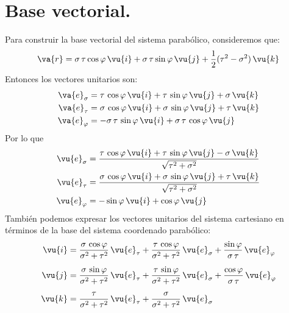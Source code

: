 \section{Base vectorial.}
Para construir la base vectorial del sistema parabólico, consideremos que:
\begin{align*}
\va{r} = \sigma \, \tau \cos \varphi \, \vu{i} + \sigma \, \tau \sin \varphi \, \vu{j} + \dfrac{1}{2} (\tau^{2} - \sigma^{2}) \, \vu{k}
\end{align*}
Entonces los vectores unitarios son:
\begin{align*}
\va{e}_{\sigma} &= \tau \, \cos \varphi \, \vu{i} + \tau \, \sin \varphi \, \vu{j} + \sigma \, \vu{k} \\
\va{e}_{\tau} &= \sigma \, \cos \varphi \, \vu{i} + \sigma \, \sin \varphi \, \vu{j} + \tau \, \vu{k} \\
\va{e}_{\varphi} &= - \sigma \, \tau \, \sin \varphi \, \vu{i} + \sigma \, \tau \, \cos \varphi \, \vu{j}
\end{align*}
Por lo que
\begin{align*}
\vu{e}_{\sigma} &= \dfrac{\tau \, \cos \varphi \, \vu{i} + \tau \, \sin \varphi \, \vu{j} - \sigma \, \vu{k}}{\sqrt{\tau^{2} + \sigma^{2}}} \\
\vu{e}_{\tau} &= \dfrac{\sigma \, \cos \varphi \, \vu{i} + \sigma \, \sin \varphi \, \vu{j} + \tau \, \vu{k}}{\sqrt{\tau^{2} + \sigma^{2}}} \\
\vu{e}_{\varphi} &= - \sin \varphi \, \vu{i} + \cos \varphi \, \vu{j}
\end{align*}
También podemos expresar los vectores unitarios del sistema cartesiano en términos de la base del sistema coordenado parabólico:
\begin{align*}
\vu{i} &= \dfrac{\sigma \, \cos \varphi}{\sigma^{2} + \tau^{2}} \, \vu{e}_{\tau} + \dfrac{\tau \, \cos \varphi}{\sigma^{2} + \tau^{2}} \, \vu{e}_{\sigma} + \dfrac{\sin \varphi}{\sigma \, \tau} \, \vu{e}_{\varphi} \\[0.5em]
\vu{j} &= \dfrac{\sigma \, \sin \varphi}{\sigma^{2} + \tau^{2}} \, \vu{e}_{\tau} + \dfrac{\tau \, \sin \varphi}{\sigma^{2} + \tau^{2}} \, \vu{e}_{\sigma} + \dfrac{\cos \varphi}{ \sigma \, \tau} \, \vu{e}_{\varphi} \\[0.5em]
\vu{k} &= \dfrac{\tau}{\sigma^{2} + \tau^{2}} \, \vu{e}_{\tau} + \dfrac{\sigma}{\sigma^{2} + \tau^{2}} \, \vu{e}_{\sigma}
\end{align*}

